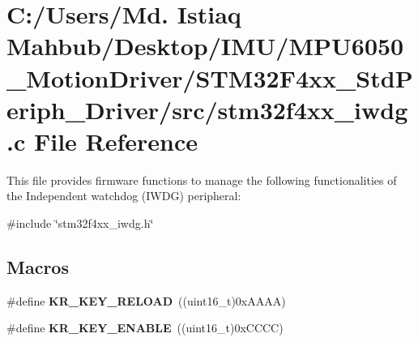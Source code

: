 \section{C\+:/\+Users/\+Md. Istiaq Mahbub/\+Desktop/\+I\+M\+U/\+M\+P\+U6050\+\_\+\+Motion\+Driver/\+S\+T\+M32\+F4xx\+\_\+\+Std\+Periph\+\_\+\+Driver/src/stm32f4xx\+\_\+iwdg.c File Reference}
\label{stm32f4xx__iwdg_8c}


This file provides firmware functions to manage the following functionalities of the Independent watchdog (I\+W\+DG) peripheral\+:  


{\ttfamily \#include \char`\"{}stm32f4xx\+\_\+iwdg.\+h\char`\"{}}\newline
\subsection*{Macros}
\begin{DoxyCompactItemize}
\item 
\#define \textbf{ K\+R\+\_\+\+K\+E\+Y\+\_\+\+R\+E\+L\+O\+AD}~((uint16\+\_\+t)0x\+A\+A\+A\+A)
\item 
\#define \textbf{ K\+R\+\_\+\+K\+E\+Y\+\_\+\+E\+N\+A\+B\+LE}~((uint16\+\_\+t)0x\+C\+C\+C\+C)
\end{DoxyCompactItemize}
